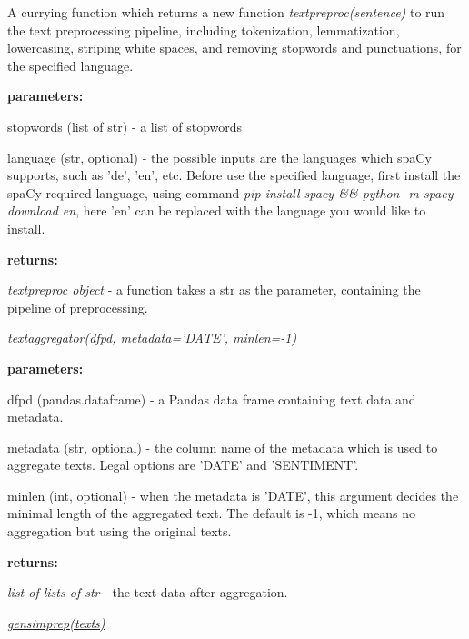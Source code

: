 \documentclass{article} %
\begin{document}
A currying function which returns a new function \textit{text\textunderscore{}preproc(sentence)} to run the text preprocessing pipeline, including tokenization, lemmatization, lowercasing, striping white spaces, and removing stopwords and punctuations, for the specified language.

\textbf{parameters: }
\begin{compactitem}
      \item stopwords (list of str) - a list of stopwords
      \item language (str, optional) - the possible inputs are the languages which spaCy supports, such as 'de', 'en', etc. Before use the specified language, first install the spaCy required language, using command \textit{pip install spacy \&\& python -m spacy download en}, here 'en' can be replaced with the language you would like to install.
\end{compactitem}

\textbf{returns:}
\begin{compactitem}
      \item \textit{text\textunderscore{}preproc object} - a function takes a str as the parameter, containing the pipeline of preprocessing.
\end{compactitem}

\underline{\textit{text\textunderscore{}aggregator(df\textunderscore{}pd, metadata='DATE', min\textunderscore{}len=-1)}}

\textbf{parameters: }
\begin{compactitem}
      \item df\textunderscore{}pd (pandas.dataframe) - a Pandas data frame containing text data and metadata.
      \item metadata (str, optional) - the column name of the metadata which is used to aggregate texts. Legal options are 'DATE' and 'SENTIMENT'.
      \item min\textunderscore{}len (int, optional) - when the metadata is 'DATE', this argument decides the minimal length of the aggregated text. The default is -1, which means no aggregation but using the original texts.
\end{compactitem}

\textbf{returns:}
\begin{compactitem}
      \item \textit{list of lists of str} - the text data after aggregation.
\end{compactitem}

\underline{\textit{gensim\textunderscore{}prep(texts)}}
\end{document}
